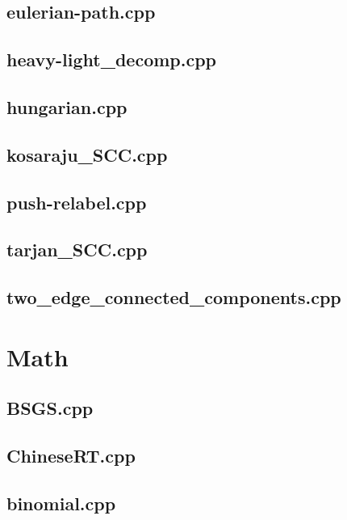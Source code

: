 \subsection{eulerian-path.cpp}

\subsection{heavy-light\_decomp.cpp}

\subsection{hungarian.cpp}

\subsection{kosaraju\_SCC.cpp}

\subsection{push-relabel.cpp}

\subsection{tarjan\_SCC.cpp}

\subsection{two\_edge\_connected\_components.cpp}

\section{Math}
\subsection{BSGS.cpp}

\subsection{ChineseRT.cpp}

\subsection{binomial.cpp}

